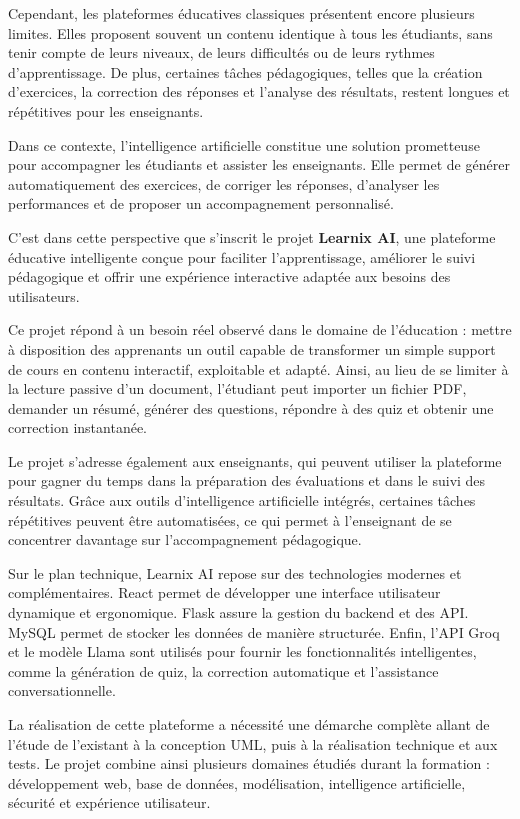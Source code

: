 \documentclass[12pt,a4paper]{report}
\begin{document}
Cependant, les plateformes éducatives classiques présentent encore plusieurs
limites. Elles proposent souvent un contenu identique à tous les étudiants,
sans tenir compte de leurs niveaux, de leurs difficultés ou de leurs rythmes
d'apprentissage. De plus, certaines tâches pédagogiques, telles que la création
d'exercices, la correction des réponses et l'analyse des résultats, restent
longues et répétitives pour les enseignants.

Dans ce contexte, l'intelligence artificielle constitue une solution prometteuse
pour accompagner les étudiants et assister les enseignants. Elle permet de
générer automatiquement des exercices, de corriger les réponses, d'analyser les
performances et de proposer un accompagnement personnalisé.

C'est dans cette perspective que s'inscrit le projet \textbf{Learnix AI}, une
plateforme éducative intelligente conçue pour faciliter l'apprentissage,
améliorer le suivi pédagogique et offrir une expérience interactive adaptée aux
besoins des utilisateurs.

Ce projet répond à un besoin réel observé dans le domaine de l'éducation :
mettre à disposition des apprenants un outil capable de transformer un simple
support de cours en contenu interactif, exploitable et adapté. Ainsi, au lieu de
se limiter à la lecture passive d'un document, l'étudiant peut importer un
fichier PDF, demander un résumé, générer des questions, répondre à des quiz et
obtenir une correction instantanée.

Le projet s'adresse également aux enseignants, qui peuvent utiliser la plateforme
pour gagner du temps dans la préparation des évaluations et dans le suivi des
résultats. Grâce aux outils d'intelligence artificielle intégrés, certaines
tâches répétitives peuvent être automatisées, ce qui permet à l'enseignant de se
concentrer davantage sur l'accompagnement pédagogique.

Sur le plan technique, Learnix AI repose sur des technologies modernes et
complémentaires. React permet de développer une interface utilisateur dynamique
et ergonomique. Flask assure la gestion du backend et des API. MySQL permet de
stocker les données de manière structurée. Enfin, l'API Groq et le modèle Llama
sont utilisés pour fournir les fonctionnalités intelligentes, comme la génération
de quiz, la correction automatique et l'assistance conversationnelle.

La réalisation de cette plateforme a nécessité une démarche complète allant de
l'étude de l'existant à la conception UML, puis à la réalisation technique et aux
tests. Le projet combine ainsi plusieurs domaines étudiés durant la formation :
développement web, base de données, modélisation, intelligence artificielle,
sécurité et expérience utilisateur.
\end{document}
